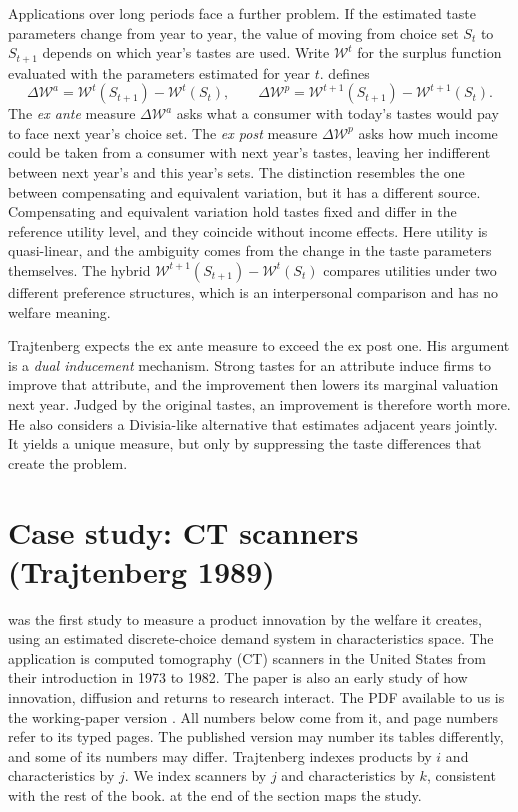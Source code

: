  Applications over long periods face a further problem.
If the estimated taste parameters change from year to year, the value of moving from choice set $S_t$ to $S_{t+1}$
depends on which year's tastes are used. Write $\mathcal{W}^t$ for the surplus function evaluated with the
parameters estimated for year $t$. \citet[pp.~56--58]{Trajtenberg1985} defines
\begin{equation}\label{eq:10-exante-expost}
\Delta\mathcal{W}^a = \mathcal{W}^t(S_{t+1}) - \mathcal{W}^t(S_t),
\qquad
\Delta\mathcal{W}^p = \mathcal{W}^{t+1}(S_{t+1}) - \mathcal{W}^{t+1}(S_t).
\end{equation}
The \emph{ex ante} measure $\Delta\mathcal{W}^a$ asks what a consumer with today's tastes would pay to face next
year's choice set. The \emph{ex post} measure $\Delta\mathcal{W}^p$ asks how much income could be taken from a
consumer with next year's tastes, leaving her indifferent between next year's and this year's sets. The
distinction resembles the one between compensating and equivalent variation, but it has a different source.
Compensating and equivalent variation hold tastes fixed and differ in the reference utility level, and they
coincide without income effects. Here utility is quasi-linear, and the ambiguity comes from the change in the taste
parameters themselves. The hybrid $\mathcal{W}^{t+1}(S_{t+1}) - \mathcal{W}^t(S_t)$ compares utilities under two
different preference structures, which is an interpersonal comparison and has no welfare meaning.

Trajtenberg expects the ex ante measure to exceed the ex post one. His argument is a \emph{dual inducement}
mechanism. Strong tastes for an attribute induce firms to improve that attribute, and the improvement then lowers
its marginal valuation next year. Judged by the original tastes, an improvement is therefore worth more. He also
considers a Divisia-like alternative that estimates adjacent years jointly. It yields a unique measure, but only by
suppressing the taste differences that create the problem.

\section{Case study: CT scanners (Trajtenberg 1989)}\label{sec:10-trajtenberg}

\citet{Trajtenberg1989} was the first study to measure a product innovation by the welfare it creates, using an
estimated discrete-choice demand system in characteristics space. The application is computed tomography (CT)
scanners in the United States from their introduction in 1973 to 1982. The paper is also an early study of how
innovation, diffusion and returns to research interact. The PDF available to us is the working-paper version
\citep{Trajtenberg1985}. All numbers below come from it, and page numbers refer to its typed pages. The
published version may number its tables differently, and some of its numbers may differ.
Trajtenberg indexes products by $i$ and characteristics by $j$. We index scanners by $j$ and characteristics by
$k$, consistent with the rest of the book.  at the end of the section maps the study.

